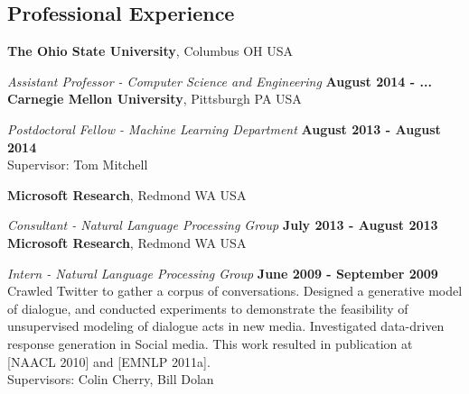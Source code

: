 \documentclass[margin,line]{res}
\begin{document}
\begin{resume}
\begin{comment}
{\bf Latent Variable Models of Lexical Semantics}
I have applied a variant of Latent Dirichlet Allocation to automatically infer the argument types or Selectional Preferences of textual relations [ACL 2010].  Our model of selectional preferences is useful in filtering improper applications of inference rules in context, showing a substantial improvement over a state-of-the-art rule-filtering system which makes use of a predefined set of classes.  In addition, I have applied latent variable models to automatically induce an appropriate set of categories for events mentioned on Twitter [KDD 2012].  By leveraging large quantities of unlabeled data we are able to outperform a supervised baseline at the task of categorizing events extracted from Twitter.  I have also investigated an approach to Distant Supervision using Topic Models.  As a distant source of supervision we make use of lexical entries from Freebase, a large, open-domain database, to generate constraints in the model. This approach leverages the ambiguous supervision provided by Freebase in a principled way, significantly outperforming Co-Training on a weakly supervised named entity classification task [EMNLP 2011a].
\end{comment}

\section{\sc Professional Experience}

{\bf The Ohio State University},
Columbus OH USA

\vspace{-.3cm}
{\em Assistant Professor - Computer Science and Engineering} \hfill {\bf August 2014 - ...}\\

{\bf Carnegie Mellon University},
Pittsburgh PA USA

\vspace{-.3cm}
{\em Postdoctoral Fellow - Machine Learning Department} \hfill {\bf August 2013 - August 2014}\\
Supervisor: Tom Mitchell

{\bf Microsoft Research},
Redmond WA USA

\vspace{-.3cm}
{\em Consultant - Natural Language Processing Group} \hfill {\bf July 2013 - August 2013}\\

{\bf Microsoft Research},
Redmond WA USA

\vspace{-.3cm}
{\em Intern - Natural Language Processing Group} \hfill {\bf June 2009 - September 2009}\\
Crawled Twitter to gather a corpus of conversations.
Designed a generative model of dialogue, and conducted experiments to demonstrate
the feasibility of unsupervised modeling of dialogue acts in new media.  
Investigated data-driven response generation in Social media.
This work resulted  in publication at [NAACL 2010] and [EMNLP 2011a].\\
Supervisors: Colin Cherry, Bill Dolan


\end{resume}
\end{document}

